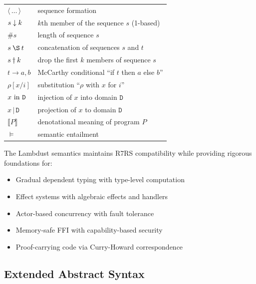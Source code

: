 \onecolumn
\begin{tabular}{ll}
$\langle\,\ldots\,\rangle$ & sequence formation \\
$s \downarrow k$                 & $k$th member of the sequence $s$ (1-based) \\
$\#s$                      & length of sequence $s$ \\
$s \:\S\: t$               & concatenation of sequences $s$ and $t$ \\
$s \dagger k$                & drop the first $k$ members of sequence $s$ \\
$t \rightarrow a, b$       & McCarthy conditional ``if $t$ then $a$ else $b$'' \\
$\rho[x/i]$                & substitution ``$\rho$ with $x$ for $i$'' \\
$x\hbox{ \rm in }{\texttt{D}}$         & injection of $x$ into domain $\texttt{D}$ \\
$x\,\vert\,\texttt{D}$       & projection of $x$ to domain $\texttt{D}$ \\
$\llbracket P \rrbracket$  & denotational meaning of program $P$ \\
$\models$                  & semantic entailment
\end{tabular}
\twocolumn

The Lambdust semantics maintains R7RS compatibility while providing rigorous foundations for:
\begin{itemize}
\item Gradual dependent typing with type-level computation
\item Effect systems with algebraic effects and handlers  
\item Actor-based concurrency with fault tolerance
\item Memory-safe FFI with capability-based security
\item Proof-carrying code via Curry-Howard correspondence
\end{itemize}

\subsection{Extended Abstract Syntax}

\def\K{\hbox{\rm K}}
\def\I{\hbox{\rm I}}
\def\E{\hbox{\rm E}}
\def\T{\hbox{\rm T}}
\def\F{\hbox{\rm F}}
\def\C{\hbox{$\Gamma$}}
\def\Con{\hbox{\rm Con}}
\def\Ide{\hbox{\rm Ide}}
\def\Typ{\hbox{\rm Typ}}
\def\Eff{\hbox{\rm Eff}}
\def\Exp{\hbox{\rm Exp}}
\def\Com{\hbox{\rm Com}}
\def\Prf{\hbox{\rm Prf}}
\def\|{$\vert$}

